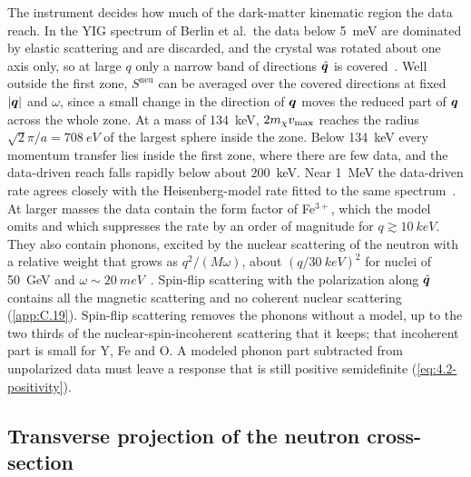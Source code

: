 The instrument decides how much of the dark-matter kinematic region the data reach. In the YIG spectrum of Berlin et al.\ the data below \SI{5}{meV} are dominated by elastic scattering and are discarded, and the crystal was rotated about one axis only, so at large $q$ only a narrow band of directions $\hat{\bm{q}}$ is covered~\cite[Sect.~III\,B and App.~D]{berlin2025determining}. Well outside the first zone, $S^{\mathrm{neu}}$ can be averaged over the covered directions at fixed $|\bm{q}|$ and $\omega$, since a small change in the direction of $\bm{q}$ moves the reduced part of $\bm{q}$ across the whole zone. At a mass of \SI{134}{keV}, $2m_{\chi} v_{\mathrm{max}}$ reaches the radius $\sqrt2\pi/a = \SI{708}{eV}$ of the largest sphere inside the zone. Below \SI{134}{keV} every momentum transfer lies inside the first zone, where there are few data, and the data-driven reach falls rapidly below about \SI{200}{keV}. Near \SI{1}{MeV} the data-driven rate agrees closely with the Heisenberg-model rate fitted to the same spectrum~\cite[Fig.~3]{berlin2025determining}. At larger masses the data contain the form factor of Fe$^{3+}$, which the model omits and which suppresses the rate by an order of magnitude for $q \gtrsim \SI{10}{keV}$. They also contain phonons, excited by the nuclear scattering of the neutron with a relative weight that grows as $q^2/(M\omega)$, about $(q/\SI{30}{keV})^2$ for nuclei of \SI{50}{GeV} and $\omega \sim \SI{20}{meV}$~\cite[App.~C]{berlin2025determining}. Spin-flip scattering with the polarization along $\hat{\bm{q}}$ contains all the magnetic scattering and no coherent nuclear scattering (\cref{app:C.19}). Spin-flip scattering removes the phonons without a model, up to the two thirds of the nuclear-spin-incoherent scattering that it keeps; that incoherent part is small for Y, Fe and O. A modeled phonon part subtracted from unpolarized data must leave a response that is still positive semidefinite (\cref{eq:4.2-positivity}).

\subsection{Transverse projection of the neutron cross-section}


